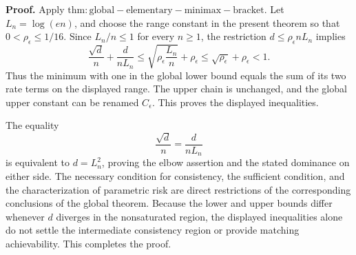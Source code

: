 \textbf{Proof.}
Apply \(\mathrm{thm:global-elementary-minimax-bracket}\).  Let
\(L_n=\log(en)\), and choose the range constant in the present theorem so that
\(0<\rho_\epsilon\leq1/16\).  Since \(L_n/n\leq1\) for every \(n\geq1\), the restriction
\(d\leq\rho_\epsilon nL_n\) implies
\[
 \frac{\sqrt d}{n}+\frac d{nL_n}
 \leq\sqrt{\rho_\epsilon\frac{L_n}{n}}+\rho_\epsilon
 \leq\sqrt{\rho_\epsilon}+\rho_\epsilon<1.
\]
Thus the minimum with one in the global lower bound equals the sum of its two rate terms on the displayed range.  The upper chain is unchanged, and the global upper constant can be renamed \(C_\epsilon\).  This proves the displayed inequalities.

The equality
\[
 \frac{\sqrt d}{n}=\frac d{nL_n}
\]
is equivalent to \(d=L_n^2\), proving the elbow assertion and the stated dominance on either side.  The necessary condition for consistency, the sufficient condition, and the characterization of parametric risk are direct restrictions of the corresponding conclusions of the global theorem.  Because the lower and upper bounds differ whenever \(d\) diverges in the nonsaturated region, the displayed inequalities alone do not settle the intermediate consistency region or provide matching achievability.  This completes the proof.